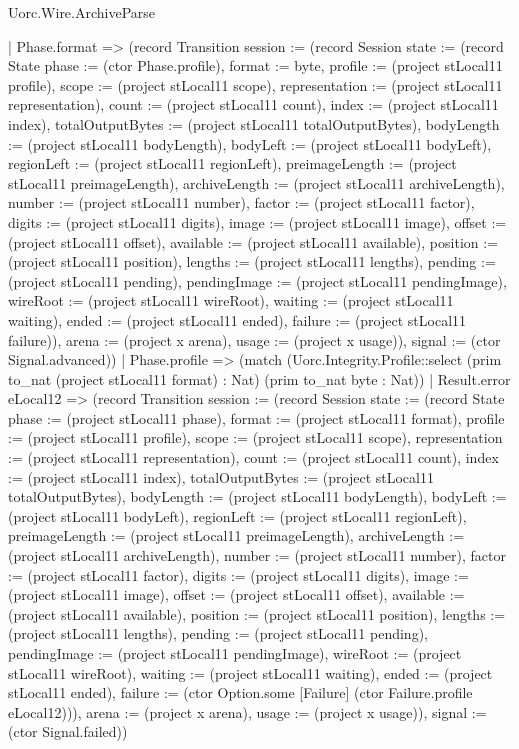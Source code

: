 \begin{lexlean}{Uorc.Wire.ArchiveParse}
\begin{semanticmodule}
{    | Phase.format => (record Transition {session := (record Session {state := (record State {phase := (ctor Phase.profile), format := byte, profile := (project stLocal11 profile), scope := (project stLocal11 scope), representation := (project stLocal11 representation), count := (project stLocal11 count), index := (project stLocal11 index), totalOutputBytes := (project stLocal11 totalOutputBytes), bodyLength := (project stLocal11 bodyLength), bodyLeft := (project stLocal11 bodyLeft), regionLeft := (project stLocal11 regionLeft), preimageLength := (project stLocal11 preimageLength), archiveLength := (project stLocal11 archiveLength), number := (project stLocal11 number), factor := (project stLocal11 factor), digits := (project stLocal11 digits), image := (project stLocal11 image), offset := (project stLocal11 offset), available := (project stLocal11 available), position := (project stLocal11 position), lengths := (project stLocal11 lengths), pending := (project stLocal11 pending), pendingImage := (project stLocal11 pendingImage), wireRoot := (project stLocal11 wireRoot), waiting := (project stLocal11 waiting), ended := (project stLocal11 ended), failure := (project stLocal11 failure)}), arena := (project x arena), usage := (project x usage)}), signal := (ctor Signal.advanced)})
    | Phase.profile => (match (Uorc.Integrity.Profile::select (prim to_nat (project stLocal11 format) : Nat) (prim to_nat byte : Nat))
      | Result.error eLocal12 => (record Transition {session := (record Session {state := (record State {phase := (project stLocal11 phase), format := (project stLocal11 format), profile := (project stLocal11 profile), scope := (project stLocal11 scope), representation := (project stLocal11 representation), count := (project stLocal11 count), index := (project stLocal11 index), totalOutputBytes := (project stLocal11 totalOutputBytes), bodyLength := (project stLocal11 bodyLength), bodyLeft := (project stLocal11 bodyLeft), regionLeft := (project stLocal11 regionLeft), preimageLength := (project stLocal11 preimageLength), archiveLength := (project stLocal11 archiveLength), number := (project stLocal11 number), factor := (project stLocal11 factor), digits := (project stLocal11 digits), image := (project stLocal11 image), offset := (project stLocal11 offset), available := (project stLocal11 available), position := (project stLocal11 position), lengths := (project stLocal11 lengths), pending := (project stLocal11 pending), pendingImage := (project stLocal11 pendingImage), wireRoot := (project stLocal11 wireRoot), waiting := (project stLocal11 waiting), ended := (project stLocal11 ended), failure := (ctor Option.some [Failure] (ctor Failure.profile eLocal12))}), arena := (project x arena), usage := (project x usage)}), signal := (ctor Signal.failed)})
}
\end{semanticmodule}
\end{lexlean}
